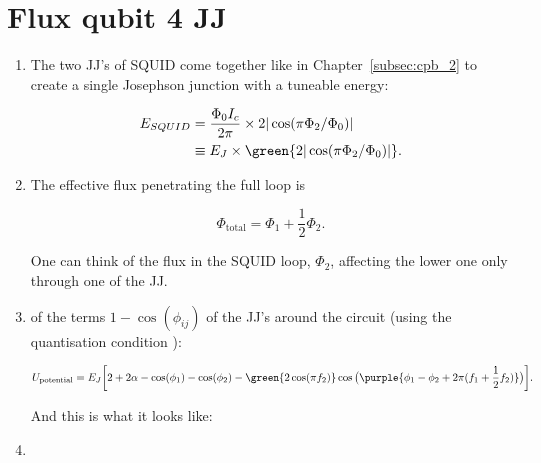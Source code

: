 \section{Flux qubit 4 JJ \cite{mooij1999}}
  
  
 \begin{enumerate}
 	\item The two JJ's of SQUID come together like in Chapter~\ref{subsec:cpb_2} to create a single Josephson junction with a tuneable energy:
 	
 	\begin{equation}\label{key}
 		\begin{aligned}
 			E_{SQUID} & = \frac{\Phi_0I_c}{2\pi}\times 2|\cos(\pi\Phi_\text{2}/\Phi_0)|\\
 			& \equiv E_J \times \green{2|\cos(\pi\Phi_\text{2}/\Phi_0)|}.
 		\end{aligned}
 	\end{equation}
 	
 	\item The effective flux penetrating the full loop is 
 	
 	\begin{equation}\label{key}
 		\Phi_\text{total} = \Phi_1 + \frac{1}{2}\Phi_2.
 	\end{equation}
 	
 	\noindent One can think of the flux in the SQUID loop, $ \Phi_2 $, affecting the lower one only through one of the JJ.
 	
 	\item {} of the terms $ 1 - \cos(\phi_{ij}) $ of the JJ's around the circuit (using the quantisation condition ):
 	
 	\begin{equation}\label{key}
 		U_\text{potential} = E_J \bigg[2 + 2\alpha - \cos(\phi_1) - \cos(\phi_2) - \green{2\cos(\pi f_2)}\cos\big(\purple{\phi_1 - \phi_2 + 2\pi(f_1+\frac{1}{2}f_2)}\big) \bigg].
 	\end{equation}
 	
 	\noindent And this is what it looks like:
 	
 	
 	\item \
 	

\end{enumerate}
